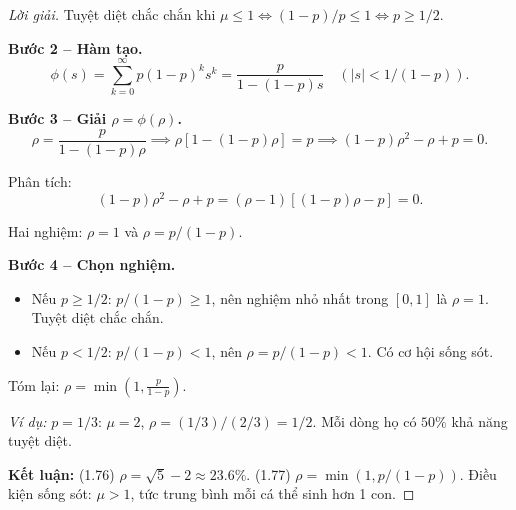 \documentclass[8pt,a4paper]{article}
\newenvironment{solution}{\begin{proof}[Lời giải]}{\end{proof}}
\begin{document}
\begin{solution}
Tuyệt diệt chắc chắn khi $\mu \leq 1 \iff (1-p)/p \leq 1 \iff p \geq 1/2$.

\textbf{Bước 2 -- Hàm tạo.}
\[
  \phi(s) = \sum_{k=0}^{\infty} p(1-p)^k s^k = \frac{p}{1 - (1-p)s} \quad (|s| < 1/(1-p)).
\]

\textbf{Bước 3 -- Giải $\rho = \phi(\rho)$.}
\[
  \rho = \frac{p}{1-(1-p)\rho} \implies \rho[1-(1-p)\rho] = p \implies (1-p)\rho^2 - \rho + p = 0.
\]

Phân tích:
\[
  (1-p)\rho^2 - \rho + p = (\rho - 1)[(1-p)\rho - p] = 0.
\]

Hai nghiệm: $\rho = 1$ và $\rho = p/(1-p)$.

\textbf{Bước 4 -- Chọn nghiệm.}
\begin{itemize}[nosep]
  \item Nếu $p \geq 1/2$: $p/(1-p) \geq 1$, nên nghiệm nhỏ nhất trong $[0,1]$ là $\rho = 1$. Tuyệt diệt chắc chắn.
  \item Nếu $p < 1/2$: $p/(1-p) < 1$, nên $\rho = p/(1-p) < 1$. Có cơ hội sống sót.
\end{itemize}

Tóm lại: $\boxed{\rho = \min\left(1, \frac{p}{1-p}\right)}$.

\textit{Ví dụ:} $p = 1/3$: $\mu = 2$, $\rho = (1/3)/(2/3) = 1/2$. Mỗi dòng họ có $50\%$ khả năng tuyệt diệt.

\textbf{Kết luận:} (1.76) $\rho = \sqrt{5}-2 \approx 23.6\%$. (1.77) $\rho = \min(1, p/(1-p))$. Điều kiện sống sót: $\mu > 1$, tức trung bình mỗi cá thể sinh hơn 1 con.
\end{solution}
\end{document}
